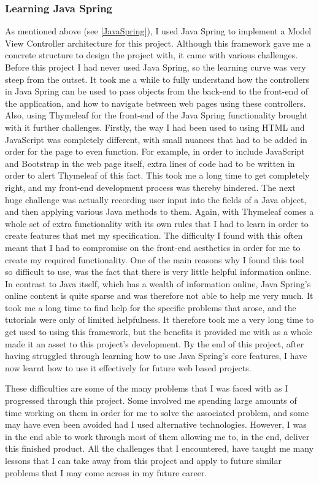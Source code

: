 \subsubsection{Learning Java Spring}
As mentioned above (see \ref{JavaSpring}), I used Java Spring to implement a Model View Controller architecture for this project. Although this framework gave me a concrete structure to design the project with, it came with various challenges. Before this project I had never used Java Spring, so the learning curve was very steep from the outset. It took me a while to fully understand how the controllers in Java Spring can be used to pass objects from the back-end to the front-end of the application, and how to navigate between web pages using these controllers. Also, using Thymeleaf for the front-end of the Java Spring functionality brought with it further challenges. Firstly, the way I had been used to using HTML and JavaScript was completely different, with small nuances that had to be added in order for the page to even function. For example, in order to include JavaScript and Bootstrap in the web page itself, extra lines of code had to be written in order to alert Thymeleaf of this fact. This took me a long time to get completely right, and my front-end development process was thereby hindered. The next huge challenge was actually recording user input into the fields of a Java object, and then applying various Java methods to them. Again, with Thymeleaf comes a whole set of extra functionality with its own rules that I had to learn in order to create features that met my specification. The difficulty I found with this often meant that I had to compromise on the front-end aesthetics in order for me to create my required functionality. One of the main reasons why I found this tool so difficult to use, was the fact that there is very little helpful information online. In contrast to Java itself, which has a wealth of information online, Java Spring's online content is quite sparse and was therefore not able to help me very much. It took me a long time to find help for the specific problems that arose, and the tutorials were only of limited helpfulness. It therefore took me a very long time to get used to using this framework, but the benefits it provided me with as a whole made it an asset to this project's development. By the end of this project, after having struggled through learning how to use Java Spring's core features, I have now learnt how to use it effectively for future web based projects.

These difficulties are some of the many problems that I was faced with as I progressed through this project. Some involved me spending large amounts of time working on them in order for me to solve the associated problem, and some may have even been avoided had I used alternative technologies. However, I was in the end able to work through most of them allowing me to, in the end, deliver this finished product. All the challenges that I encountered, have taught me many lessons that I can take away from this project and apply to future similar problems that I may come across in my future career. 

